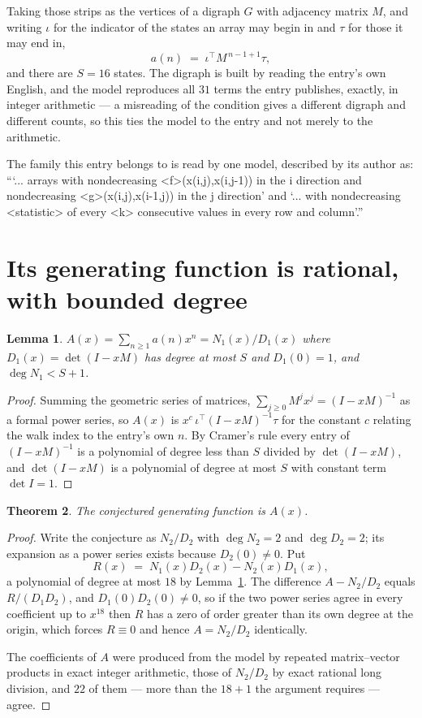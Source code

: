 \documentclass[11pt,a4paper]{article}
\theoremstyle{plain}
\newtheorem{theorem}{Theorem}
\newtheorem{lemma}[theorem]{Lemma}
\theoremstyle{definition}
\begin{document}
Taking those strips as the vertices of a digraph $G$ with adjacency matrix $M$, and writing
$\iota$ for the indicator of the states an array may begin in and $\tau$ for those it may end
in,
\[
a(n)\;=\;\iota^{\!\top}M^{\,n-1+1}\tau ,
\]
and there are $S=16$ states. The digraph is built by reading the entry's own English, and the
model reproduces all $31$ terms the entry publishes, exactly, in integer arithmetic --- a
misreading of the condition gives a different digraph and different counts, so this ties the
model to the entry and not merely to the arithmetic.

The family this entry belongs to is read by one model, described by its author as: ```... arrays with nondecreasing <f>(x(i,j),x(i,j-1)) in the i direction and nondecreasing <g>(x(i,j),x(i-1,j)) in the j direction' and `... with nondecreasing <statistic> of every <k> consecutive values in every row and column'.''


\section{Its generating function is rational, with bounded degree}

\begin{lemma}\label{lem:rat}
$A(x)=\sum_{n\ge1}a(n)x^n=N_1(x)/D_1(x)$ where $D_1(x)=\det(I-xM)$ has degree at most
$S$ and $D_1(0)=1$, and $\deg N_1<S+1$.
\end{lemma}

\begin{proof}
Summing the geometric series of matrices, $\sum_{j\ge0}M^jx^j=(I-xM)^{-1}$ as a formal
power series, so $A(x)$ is $x^{c}\,\iota^{\!\top}(I-xM)^{-1}\tau$ for the constant $c$
relating the walk index to the entry's own $n$. By Cramer's rule every entry of
$(I-xM)^{-1}$ is a polynomial of degree less than $S$ divided by $\det(I-xM)$, and
$\det(I-xM)$ is a polynomial of degree at most $S$ with constant term $\det I=1$.
\end{proof}

\begin{theorem}
The conjectured generating function is $A(x)$.
\end{theorem}

\begin{proof}
Write the conjecture as $N_2/D_2$ with $\deg N_2=2$ and $\deg D_2=2$; its expansion as a
power series exists because $D_2(0)\neq0$. Put
\[
R(x)\;=\;N_1(x)D_2(x)-N_2(x)D_1(x),
\]
a polynomial of degree at most $18$ by Lemma~\ref{lem:rat}. The difference
$A-N_2/D_2$ equals $R/(D_1D_2)$, and $D_1(0)D_2(0)\neq0$, so if the two power series agree in
every coefficient up to $x^{18}$ then $R$ has a zero of order greater than its own
degree at the origin, which forces $R\equiv0$ and hence $A=N_2/D_2$ identically.

The coefficients of $A$ were produced from the model by repeated matrix--vector products in
exact integer arithmetic, those of $N_2/D_2$ by exact rational long division, and $22$
of them --- more than the $18+1$ the argument requires --- agree.
\end{proof}
\end{document}
